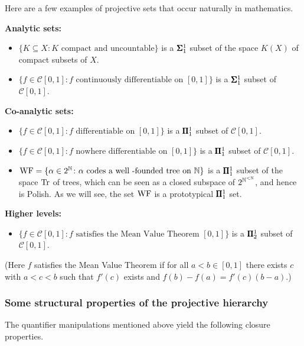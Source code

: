 Here are a few examples of projective sets that occur naturally in mathematics.

\textbf{Analytic sets:}

\begin{itemize}
\item $\{K \subseteq X \colon K \text{ compact and uncountable} \}$ is a $\pmb{\Sigma}^{1}_{1}$ subset of the space $K(X)$ of compact subsets of $X$.


\item $\{f \in \mathcal{C}[0,1]\colon f \text{ continuously differentiable on } [0,1]\}$ is a $\pmb{\Sigma}^{1}_{1}$ subset of $\mathcal{C}[0,1]$.
\end{itemize}

\textbf{Co-analytic sets:}

\begin{itemize}
\item $\{f \in \mathcal{C}[0,1]\colon f \text{ differentiable on } [0,1]\}$ is a $\pmb{\Pi}^1_{1}$ subset of $\mathcal{C}[0,1]$.


\item $\{f \in \mathcal{C}[0,1]\colon f \text{ nowhere differentiable on } [0,1]\}$ is a $\pmb{\Pi}^1_{1}$ subset of $\mathcal{C}[0,1]$.


\item $\operatorname{WF} = \{\alpha \in 2^{\mathbb{N}} \colon \alpha \text{ codes a well -founded tree on } \mathbb{N} \}$ is a $\pmb{\Pi}^1_{1}$ subset of the space $\operatorname{Tr}$ of trees, which can be seen as a closed subspace of $2^{\mathbb{N}^{<\mathbb{N}}}$, and hence is Polish. As we will see, the set $\operatorname{WF}$ is a prototypical $\pmb{\Pi}^1_{1}$ set.
\end{itemize}

\textbf{Higher levels:}

\begin{itemize}
\item $\{f \in \mathcal{C}[0,1]\colon f \text{ satisfies the Mean Value Theorem } [0,1]\}$ is a $\pmb{\Pi}^1_{2}$ subset of $\mathcal{C}[0,1]$.
\end{itemize}

(Here $f$ satisfies the Mean Value Theorem if for all $a < b \in [0,1]$ there exists $c$ with $a < c < b$ such that  $f'(c)$ exists and $f(b) - f(a) = f'(c)(b -a)$.)

\subsubsection{Some structural properties of the projective hierarchy}

The quantifier manipulations mentioned above yield the following closure properties.

